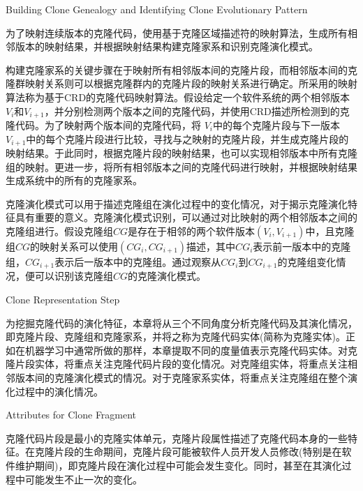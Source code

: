 
{Building Clone Genealogy and Identifying Clone Evolutionary Pattern}

为了映射连续版本的克隆代码，使用基于克隆区域描述符的映射算法，生成所有相邻版本的映射结果，并根据映射结果构建克隆家系和识别克隆演化模式。

构建克隆家系的关键步骤在于映射所有相邻版本间的克隆片段，而相邻版本间的克隆群映射关系则可以根据克隆群内的克隆片段的映射关系进行确定。所采用的映射算法称为基于CRD的克隆代码映射算法\cite{ci2013new}\cite{ci2013newD}。假设给定一个软件系统的两个相邻版本{$V_i$}和{$V_ {i + 1}$}，并分别检测两个版本之间的克隆代码，并使用CRD描述所检测到的克隆代码。为了映射两个版本间的克隆代码，将{ $V_i$}中的每个克隆片段与下一版本{$ V_{i+1}$}中的每个克隆片段进行比较，寻找与之映射的克隆片段，并生成克隆片段的映射结果。于此同时，根据克隆片段的映射结果，也可以实现相邻版本中所有克隆组的映射。更进一步，将所有相邻版本之间的克隆代码进行映射，并根据映射结果生成系统中的所有的克隆家系。

克隆演化模式可以用于描述克隆组在演化过程中的变化情况，对于揭示克隆演化特征具有重要的意义。克隆演化模式识别，可以通过对比映射的两个相邻版本之间的克隆组进行。假设克隆组$CG$是存在于相邻的两个软件版本{$(V_i,V_{i+1})$}中，且克隆组$CG$的映射关系可以使用{$(CG_i, CG_{i+1})$}描述，其中{$CG_i$}表示前一版本中的克隆组，{$CG_{i+1}$}表示后一版本中的克隆组。通过观察从{$CG_i$}到{$CG_{i+1}$}的克隆组变化情况，便可以识别该克隆组{$CG$}的克隆演化模式。


{Clone Representation Step}

为挖掘克隆代码的演化特征，本章将从三个不同角度分析克隆代码及其演化情况，即克隆片段、克隆组和克隆家系，并将之称为克隆代码实体(简称为克隆实体)。正如在机器学习中通常所做的那样，本章提取不同的度量值表示克隆代码实体。对克隆片段实体，将重点关注克隆代码片段的变化情况。对克隆组实体，将重点关注相邻版本间的克隆演化模式的情况。对于克隆家系实体，将重点关注克隆组在整个演化过程中的演化情况。

{Attributes for Clone Fragment }

克隆代码片段是最小的克隆实体单元，克隆片段属性描述了克隆代码本身的一些特征。在克隆片段的生命期间，克隆片段可能被软件人员开发人员修改(特别是在软件维护期间)，即克隆片段在演化过程中可能会发生变化。同时，甚至在其演化过程中可能发生不止一次的变化。

